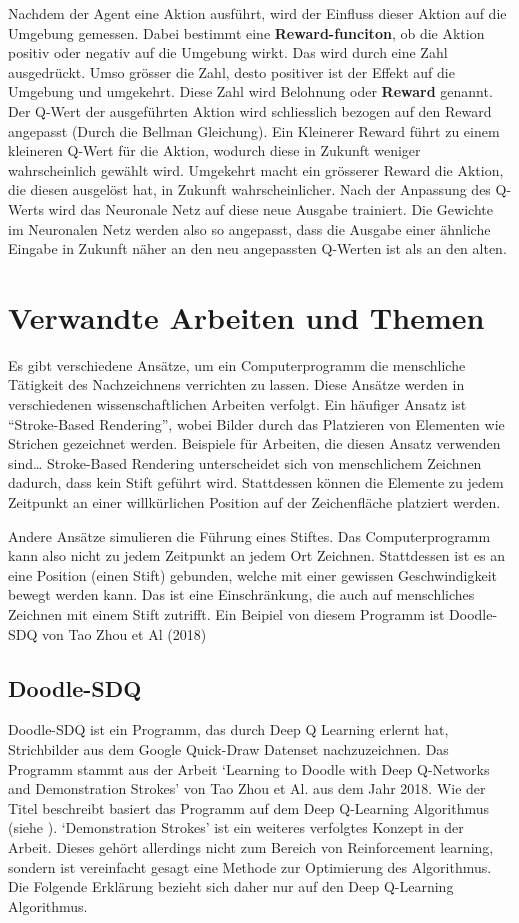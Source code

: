 Nachdem der Agent eine Aktion ausführt, wird der Einfluss dieser Aktion auf die
Umgebung gemessen. Dabei bestimmt eine \textbf{Reward-funciton}, ob die Aktion
positiv oder negativ auf die Umgebung wirkt. Das wird durch eine Zahl
ausgedrückt. Umso grösser die Zahl, desto positiver ist der Effekt auf die
Umgebung und umgekehrt. Diese Zahl wird Belohnung oder \textbf{Reward} genannt.
Der Q-Wert der ausgeführten Aktion wird schliesslich bezogen auf den Reward
angepasst (Durch die Bellman Gleichung). Ein Kleinerer Reward führt zu einem
kleineren Q-Wert für die Aktion, wodurch diese in Zukunft weniger wahrscheinlich
gewählt wird. Umgekehrt macht ein grösserer Reward die Aktion, die diesen
ausgelöst hat, in Zukunft wahrscheinlicher. Nach der Anpassung des Q-Werts wird
das Neuronale Netz auf diese neue Ausgabe trainiert. Die Gewichte im Neuronalen
Netz werden also so angepasst, dass die Ausgabe einer ähnliche Eingabe in
Zukunft näher an den neu angepassten Q-Werten ist als an den alten.


\section{Verwandte Arbeiten und Themen}
\label{chap:t_verwandt}
Es gibt verschiedene Ansätze, um ein Computerprogramm die menschliche Tätigkeit
des Nachzeichnens verrichten zu lassen. Diese Ansätze werden in verschiedenen
wissenschaftlichen Arbeiten verfolgt. Ein häufiger Ansatz ist ``Stroke-Based
Rendering'', wobei Bilder durch das Platzieren von Elementen wie Strichen
gezeichnet werden. Beispiele für Arbeiten, die diesen Ansatz verwenden sind\dots %
Stroke-Based Rendering unterscheidet sich von menschlichem Zeichnen dadurch,
dass kein Stift geführt wird. Stattdessen können die Elemente zu jedem Zeitpunkt
an einer willkürlichen Position auf der Zeichenfläche platziert werden.

Andere Ansätze simulieren die Führung eines Stiftes. Das Computerprogramm kann
also nicht zu jedem Zeitpunkt an jedem Ort Zeichnen. Stattdessen ist es an eine
Position (einen Stift) gebunden, welche mit einer gewissen Geschwindigkeit
bewegt werden kann. Das ist eine Einschränkung, die auch auf menschliches
Zeichnen mit einem Stift zutrifft. Ein Beipiel von diesem Programm ist Doodle-SDQ von Tao Zhou et Al (2018)

\subsection*{Doodle-SDQ}
Doodle-SDQ ist ein Programm, das durch Deep Q Learning erlernt hat, Strichbilder
aus dem Google Quick-Draw Datenset nachzuzeichnen. Das Programm stammt aus der
Arbeit `Learning to Doodle with Deep Q-Networks and Demonstration Strokes' von
Tao Zhou et Al. aus dem Jahr 2018. Wie der Titel beschreibt basiert das Programm
auf dem Deep Q-Learning Algorithmus (siehe ). `Demonstration
Strokes' ist ein weiteres verfolgtes Konzept in der Arbeit. Dieses gehört
allerdings nicht zum Bereich von Reinforcement learning, sondern ist vereinfacht
gesagt eine Methode zur Optimierung des Algorithmus. Die Folgende Erklärung
bezieht sich daher nur auf den Deep Q-Learning Algorithmus.

